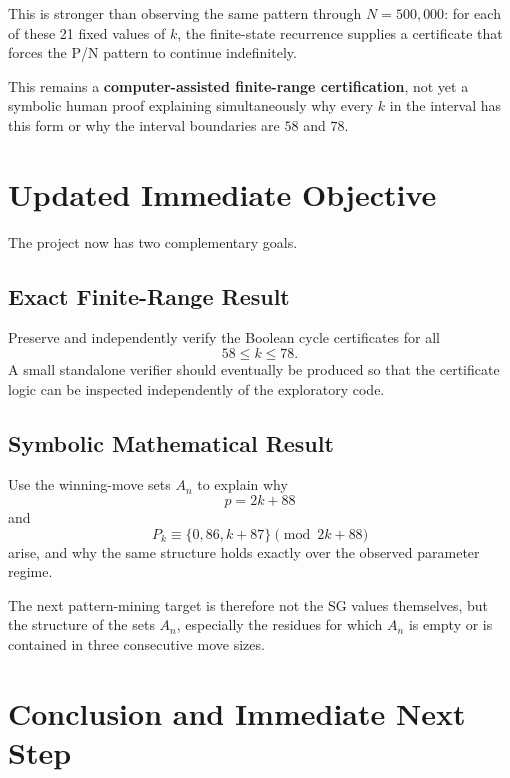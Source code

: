 \documentclass[11pt]{article}
\begin{document}
This is stronger than observing the same pattern through $N=500{,}000$: for each of these 21 fixed values of $k$, the finite-state recurrence supplies a certificate that forces the P/N pattern to continue indefinitely.

This remains a \textbf{computer-assisted finite-range certification}, not yet a symbolic human proof explaining simultaneously why every $k$ in the interval has this form or why the interval boundaries are $58$ and $78$.

\section{Updated Immediate Objective}

The project now has two complementary goals.

\subsection{Exact Finite-Range Result}
Preserve and independently verify the Boolean cycle certificates for all
\begin{equation}
    58\le k\le78.
\end{equation}
A small standalone verifier should eventually be produced so that the certificate logic can be inspected independently of the exploratory code.

\subsection{Symbolic Mathematical Result}
Use the winning-move sets $A_n$ to explain why
\begin{equation}
    p=2k+88
\end{equation}
and
\begin{equation}
    P_k\equiv\{0,86,k+87\}\pmod{2k+88}
\end{equation}
arise, and why the same structure holds exactly over the observed parameter regime.

The next pattern-mining target is therefore not the SG values themselves, but the structure of the sets $A_n$, especially the residues for which $A_n$ is empty or is contained in three consecutive move sizes.

\section{Conclusion and Immediate Next Step}
\end{document}
